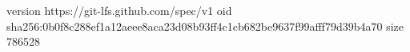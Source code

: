 version https://git-lfs.github.com/spec/v1
oid sha256:0b0f8c288ef1a12aeee8aca23d08b93ff4c1cb682be9637f99afff79d39b4a70
size 786528
